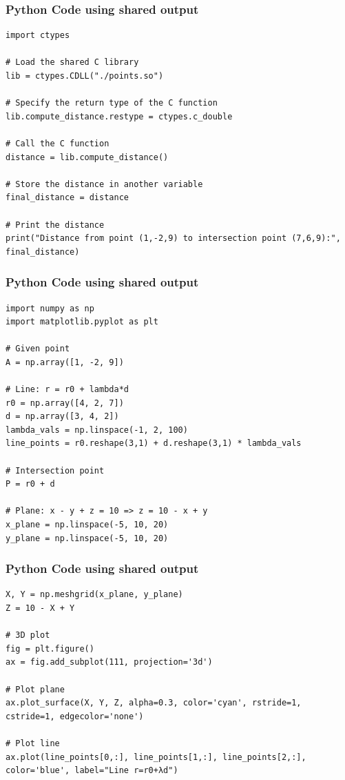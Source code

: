 \documentclass{beamer}
\begin{document}
		
		\begin{frame}[fragile]
			\frametitle{Python Code using shared output}
			\begin{lstlisting}
import ctypes

# Load the shared C library
lib = ctypes.CDLL("./points.so")

# Specify the return type of the C function
lib.compute_distance.restype = ctypes.c_double

# Call the C function
distance = lib.compute_distance()

# Store the distance in another variable
final_distance = distance

# Print the distance
print("Distance from point (1,-2,9) to intersection point (7,6,9):", final_distance)
\end{lstlisting}
\end{frame}
\begin{frame}[fragile]
			\frametitle{Python Code using shared output}
			\begin{lstlisting}
import numpy as np
import matplotlib.pyplot as plt

# Given point
A = np.array([1, -2, 9])

# Line: r = r0 + lambda*d
r0 = np.array([4, 2, 7])
d = np.array([3, 4, 2])
lambda_vals = np.linspace(-1, 2, 100)
line_points = r0.reshape(3,1) + d.reshape(3,1) * lambda_vals

# Intersection point
P = r0 + d

# Plane: x - y + z = 10 => z = 10 - x + y
x_plane = np.linspace(-5, 10, 20)
y_plane = np.linspace(-5, 10, 20)
\end{lstlisting}
\end{frame}
\begin{frame}[fragile]
			\frametitle{Python Code using shared output}
			\begin{lstlisting}
X, Y = np.meshgrid(x_plane, y_plane)
Z = 10 - X + Y

# 3D plot
fig = plt.figure()
ax = fig.add_subplot(111, projection='3d')

# Plot plane
ax.plot_surface(X, Y, Z, alpha=0.3, color='cyan', rstride=1, cstride=1, edgecolor='none')

# Plot line
ax.plot(line_points[0,:], line_points[1,:], line_points[2,:], color='blue', label="Line r=r0+λd")
\end{lstlisting}
\end{frame}
\end{document}
